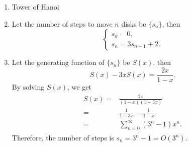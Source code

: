 \documentclass{../../cls/sig-alternate-05-2015}
\begin{document}
\begin{enumerate}[label=(\alph*)]
    \item \begin{algorithm}[H]
        \caption{Tower of Hanoi}
        \label{a:5-1}
        \begin{algorithmic}
            \State \Return
            \Else
            \State {}
            \State {}
            \State {}
            \State {}
            \State {}
            \EndIf
            \EndProcedure
        \end{algorithmic}
    \end{algorithm}

    \item Let the number of steps to move $n$ disks be $\{s_n\}$, then \begin{equation}
        \begin{cases}
        s_0 = 0,\\
        s_n = 3s_{n - 1} + 2.
        \end{cases}
    \end{equation}
    
    \item Let the generating function of $\{s_n\}$ be $S(x)$, then \begin{equation}
        S(x) - 3xS(x) = \frac{2x}{1 - x}.
    \end{equation}
    By solving $S(x)$, we get \begin{align}
        \begin{aligned}
        S(x) = & \frac{2x}{(1 - x)(1 - 3x)}\\
        = & \frac{1}{1 - 3x} - \frac{1}{1 - x}\\
        = & \sum_{n = 0}^{\infty} (3^n - 1) x^n.
        \end{aligned}
    \end{align}
    Therefore, the number of steps is $s_n = 3^n - 1 = O(3^n)$.
\end{enumerate}
\end{document}
